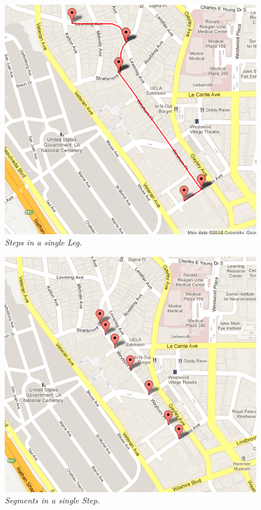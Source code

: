 \documentclass[conference]{IEEETran}
\begin{document}
\begin{figure}
\begin{center}
\includegraphics[scale=0.35]{stepsInALeg.png}
\caption{\small \sl Steps in a single Leg.\label{fig:stepsInALeg}}
\end{center}
\end{figure}
\begin{figure}
\begin{center}
\includegraphics[scale=0.35]{segmentsInAStep.png}
\caption{\small \sl Segments in a single Step.\label{fig:segmentsInAStep}}
\end{center}
\end{figure}
\end{document}
